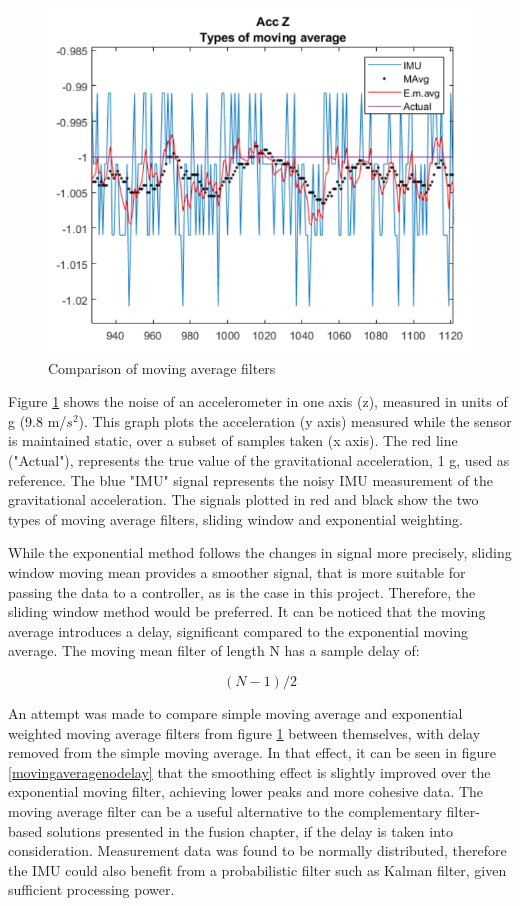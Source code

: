 \begin{figure}[H]
  \centering
  \includegraphics[scale=0.7]{graphics/accZ.png}
  \caption{Comparison of moving average filters}
  \label{movingaverage}
\end{figure}

Figure \ref{movingaverage} shows the noise of an accelerometer in one axis (z), measured in units of g (9.8 m/$s^2$). This graph plots the acceleration (y axis) measured while the sensor is maintained static, over a subset of samples taken (x axis).
The red line ("Actual"), represents the true value of the gravitational acceleration, 1 g, used as reference. The blue "IMU" signal represents the noisy IMU measurement of the gravitational acceleration. The signals plotted in red and black show the two types of moving average filters, sliding window and exponential weighting.

While the exponential method follows the changes in signal more precisely, sliding window moving mean provides a smoother signal, that is more suitable for passing the data to a controller, as is the case in this project. Therefore, the sliding window method would be preferred. 
It can be noticed that the moving average introduces a delay, significant compared to the exponential moving average. The moving mean filter of length N has a sample delay of:

\begin{equation}\label{delay}
	(N-1)/2
\end{equation}

An attempt was made to compare simple moving average and exponential weighted moving average filters from figure \ref{movingaverage} between themselves, with delay removed from the simple moving average. In that effect, it can be seen in figure \ref{movingaveragenodelay} that the smoothing effect is slightly improved over the exponential moving filter, achieving lower peaks and more cohesive data. The moving average filter can be a useful alternative to the complementary filter-based solutions presented in the fusion chapter, if the delay is taken into consideration. Measurement data was found to be normally distributed, therefore the IMU could also benefit from a probabilistic filter such as Kalman filter, given sufficient processing power. 

